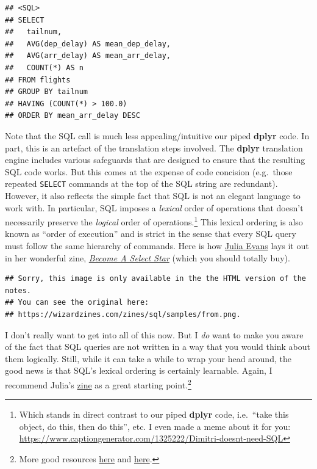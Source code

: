 \documentclass[
]{article}
\begin{document}
\begin{verbatim}
## <SQL>
## SELECT
##   tailnum,
##   AVG(dep_delay) AS mean_dep_delay,
##   AVG(arr_delay) AS mean_arr_delay,
##   COUNT(*) AS n
## FROM flights
## GROUP BY tailnum
## HAVING (COUNT(*) > 100.0)
## ORDER BY mean_arr_delay DESC
\end{verbatim}

Note that the SQL call is much less appealing/intuitive our piped
\textbf{dplyr} code. In part, this is an artefact of the translation
steps involved. The \textbf{dplyr} translation engine includes various
safeguards that are designed to ensure that the resulting SQL code
works. But this comes at the expense of code concision (e.g.~those
repeated \texttt{SELECT} commands at the top of the SQL string are
redundant). However, it also reflects the simple fact that SQL is not an
elegant language to work with. In particular, SQL imposes a
\emph{lexical} order of operations that doesn't necessarily preserve the
\emph{logical} order of operations.\footnote{Which stands in direct
  contrast to our piped \textbf{dplyr} code, i.e.~``take this object, do
  this, then do this'', etc. I even made a meme about it for you:
  \url{https://www.captiongenerator.com/1325222/Dimitri-doesnt-need-SQL}}
This lexical ordering is also known as ``order of execution'' and is
strict in the sense that every SQL query must follow the same hierarchy
of commands. Here is how \href{https://twitter.com/b0rk}{Julia Evans}
lays it out in her wonderful zine,
\href{https://wizardzines.com/zines/sql/}{\emph{Become A Select Star}}
(which you should totally buy).

\begin{verbatim}
## Sorry, this image is only available in the the HTML version of the notes.
## You can see the original here:
## https://wizardzines.com/zines/sql/samples/from.png.
\end{verbatim}

I don't really want to get into all of this now. But I \emph{do} want to
make you aware of the fact that SQL queries are not written in a way
that you would think about them logically. Still, while it can take a
while to wrap your head around, the good news is that SQL's lexical
ordering is certainly learnable. Again, I recommend Julia's
\href{https://wizardzines.com/zines/sql/}{zine} as a great starting
point.\footnote{More good resources
  \href{https://www.eversql.com/sql-order-of-operations-sql-query-order-of-execution/}{here}
  and
  \href{https://blog.jooq.org/2016/12/09/a-beginners-guide-to-the-true-order-of-sql-operations/}{here}.}
\end{document}
